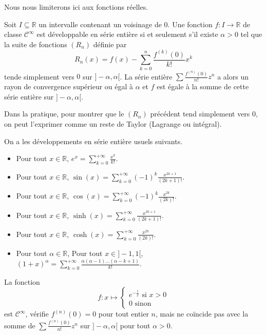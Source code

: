 	Nous nous limiterons ici aux fonctions réelles.

	\begin{proposition}
		Soit $I \subseteq \mathbb{R}$ un intervalle contenant un voisinage de $0$. Une fonction $f : I \rightarrow \mathbb{R}$ de classe $\mathcal{C}^\infty$ est développable en série entière si et seulement s'il existe $\alpha > 0$ tel que la suite de fonctions $(R_n)$ définie par
		\[ R_n(x) = f(x) - \sum_{k=0}^{n} \frac{f^{(k)}(0)}{k!} x^k \]
		tende simplement vers $0$ sur $]-\alpha, \alpha[$. La série entière $\sum \frac{f^{(n)}(0)}{n!} z^n$ a alors un rayon de convergence supérieur ou égal à $\alpha$ et $f$ est égale à la somme de cette série entière sur $]-\alpha,\alpha[$.
	\end{proposition}

	\begin{remark}
		Dans la pratique, pour montrer que le $(R_n)$ précédent tend simplement vers $0$, on peut l'exprimer comme un reste de Taylor (Lagrange ou intégral).
	\end{remark}

	\begin{example}
		On a les développements en série entière usuels suivants.
		\begin{itemize}
			\item Pour tout $x \in \mathbb{R}$, $e^x = \sum_{k=0}^{+\infty} \frac{x^k}{k!}$.
			\item Pour tout $x \in \mathbb{R}$, $\sin(x) = \sum_{k=0}^{+\infty} (-1)^{k} \frac{x^{2k+1}}{(2k+1)!}$.
			\item Pour tout $x \in \mathbb{R}$, $\cos(x) = \sum_{k=0}^{+\infty} (-1)^{k} \frac{x^{2k}}{(2k)!}$.
			\item Pour tout $x \in \mathbb{R}$, $\sinh(x) = \sum_{k=0}^{+\infty} \frac{x^{2k+1}}{(2k+1)!}$.
			\item Pour tout $x \in \mathbb{R}$, $\cosh(x) = \sum_{k=0}^{+\infty} \frac{x^{2k}}{(2k)!}$.
			\item Pour tout $\alpha \in \mathbb{R}$, Pour tout $x \in ]-1,1[$, $(1+x)^\alpha = \sum_{k=0}^{+\infty} \frac{\alpha(\alpha - 1) \dots (\alpha -k+1)}{k!}$.
		\end{itemize}
	\end{example}

	\begin{cexample}
		La fonction
		\[
		f : x \mapsto \begin{cases}
			e^{-\frac{1}{x}} \text{ si } x > 0 \\
			0 \text{ sinon}
		\end{cases}
		\]
		est $\mathcal{C}^\infty$, vérifie $f^{(n)}(0) = 0$ pour tout entier $n$, mais ne coïncide pas avec la somme de $\sum \frac{f^{(n)}(0)}{n!} z^n$ sur $]-\alpha,\alpha[$ pour tout $\alpha > 0$.
	\end{cexample}

